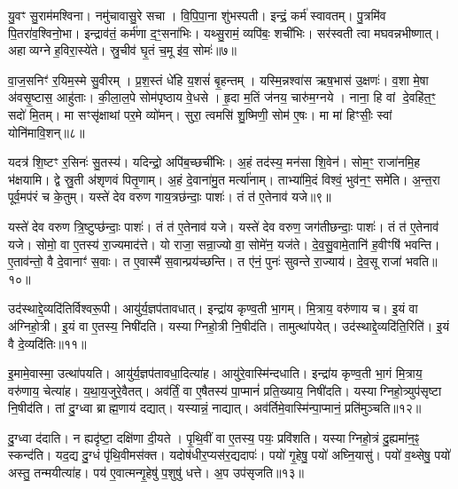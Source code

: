 यु॒वꣳ सु॒राम॑मश्विना।
नमु॑चावासु॒रे सचा।
वि॒पि॒पा॒ना शु॑भस्पती।
इन्द्रं॒ कर्म॑ स्वावतम्।
पु॒त्रमि॑व पि॒तरा॑व॒श्विनो॒भा।
इन्द्राव॑तं॒ कर्म॑णा द॒ꣳ॒सना॑भिः।
यथ्सु॒रामं॒ व्यपि॑बः॒ शची॑भिः।
सर॑स्वती त्वा मघवन्नभीष्णात्।
अहाव्यग्ने ह॒विरा॒स्ये॑ते।
स्रु॒चीव॑ घृ॒तं च॒मू इ॑व॒ सोमः॑॥७॥

वा॒ज॒सनिꣳ॑ र॒यिम॒स्मे सु॒वीरम्।
प्र॒श॒स्तं धे॑हि य॒शसं॑ बृ॒हन्तम्।
यस्मि॒न्नश्वा॑स ऋष॒भास॑ उ॒क्षणः॑।
व॒शा मे॒षा अ॑वसृ॒ष्टास॒ आहु॑ताः।
की॒ला॒ल॒पे सोम॑पृष्ठाय वे॒धसे।
हृ॒दा म॒तिं ज॑नय॒ चारु॑म॒ग्नये।
नाना॒ हि वां दे॒वहि॑त॒ꣳ॒ सदो॑ मि॒तम्।
मा सꣳसृ॑क्षाथां पर॒मे व्यो॑मन्।
सुरा॒ त्वमसि॑ शु॒ष्मिणी॒ सोम॑ ए॒षः।
मा मा॑ हिꣳसीः॒ स्वां योनि॑मावि॒शन्॥८॥

यदत्र॑ शि॒ष्टꣳ र॒सिनः॑ सु॒तस्य॑।
यदिन्द्रो॒ अपि॑ब॒च्छची॑भिः।
अ॒हं तद॑स्य॒ मन॑सा शि॒वेन॑।
सोम॒ꣳ॒ राजा॑नमि॒ह भ॑क्षयामि।
द्वे स्रु॒ती अ॑शृणवं पितृ॒णाम्।
अ॒हं दे॒वाना॑मु॒त मर्त्या॑नाम्।
ताभ्या॑मि॒दं विश्वं॒ भुव॑न॒ꣳ॒ समे॑ति।
अ॒न्त॒रा पूर्व॒मप॑रं च के॒तुम्।
यस्ते॑ देव वरुण गाय॒त्रछ॑न्दाः॒ पाशः॑।
तं त॑ ए॒तेनाव॑ यजे॥९॥

यस्ते॑ देव वरुण त्रि॒ष्टुप्छ॑न्दाः॒ पाशः॑।
तं त॑ ए॒तेनाव॑ यजे।
यस्ते॑ देव वरुण॒ जग॑तीछन्दाः॒ पाशः॑।
तं त॑ ए॒तेनाव॑ यजे।
सोमो॒ वा ए॒तस्य॑ रा॒ज्यमाद॑त्ते।
यो राजा॒ सन्रा॒ज्यो वा॒ सोमे॑न॒ यज॑ते।
दे॒व॒सु॒वामे॒तानि॑ ह॒वीꣳषि॑ भवन्ति।
ए॒ताव॑न्तो॒ वै दे॒वानाꣳ॑ स॒वाः।
त ए॒वास्मै॑ स॒वान्प्रय॑च्छन्ति।
त ए॑नं॒ पुनः॑ सुवन्ते रा॒ज्याय॑।
दे॒व॒सू राजा॑ भवति॥१०॥\anuvakamend[सोम॑ आवि॒शन् य॑जे रा॒ज्यायैकं॑ च]

उद॑स्थाद्दे॒व्यदि॑तिर्विश्वरू॒पी।
आयु॑र्य॒ज्ञप॑तावधात्।
इन्द्रा॑य कृण्व॒ती भा॒गम्।
मि॒त्राय॒ वरु॑णाय च।
इ॒यं वा अ॑ग्निहो॒त्री।
इ॒यं वा ए॒तस्य॒ निषी॑दति।
यस्याग्निहो॒त्री नि॒षीद॑ति।
तामुत्था॑पयेत्।
उद॑स्थाद्दे॒व्यदि॑ति॒रिति॑।
इ॒यं वै दे॒व्यदि॑तिः॥११॥

इ॒मामे॒वास्मा॒ उत्था॑पयति।
आयु॑र्य॒ज्ञप॑तावधा॒दित्या॑ह।
आयु॑रे॒वास्मि॑न्दधाति।
इन्द्रा॑य कृण्व॒ती भा॒गं मि॒त्राय॒ वरु॑णाय॒ चेत्या॑ह।
य॒था॒य॒जुरे॒वैतत्।
अव॑र्तिं॒ वा ए॒षैतस्य॑ पा॒प्मानं॑ प्रति॒ख्याय॒ निषी॑दति।
यस्याग्निहो॒त्र्युप॑सृष्टा नि॒षीद॑ति।
तां दु॒ग्ध्वा ब्राह्म॒णाय॑ दद्यात्।
यस्यान्नं॒ नाद्यात्।
अव॑र्तिमे॒वास्मि॑न्पा॒प्मानं॒ प्रति॑मुञ्चति॥१२॥

दु॒ग्ध्वा द॑दाति।
न ह्यदृ॑ष्टा॒ दक्षि॑णा दी॒यते।
पृ॒थि॒वीं वा ए॒तस्य॒ पयः॒ प्रवि॑शति।
यस्याग्निहो॒त्रं दु॒ह्यमा॑न॒ꣴ॒ स्कन्द॑ति।
यद॒द्य दु॒ग्धं पृ॑थि॒वीमस॑क्त।
यदोष॑धीर॒प्यस॑र॒द्यदापः॑।
पयो॑ गृ॒हेषु॒ पयो॑ अघ्नि॒यासु॑।
पयो॑ व॒थ्सेषु॒ पयो॑ अस्तु॒ तन्मयीत्या॑ह।
पय॑ ए॒वात्मन्गृ॒हेषु॑ प॒शुषु॑ धत्ते।
अ॒प उप॑सृजति॥१३॥

